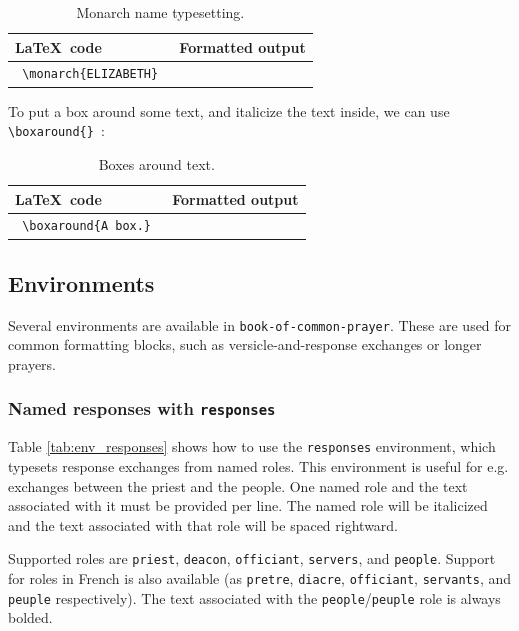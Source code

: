 \documentclass{article}
\begin{document}
\begin{table}[h!]
	\centering
	\begin{tabular}{l l} 
	\toprule
	\LaTeX\ code & Formatted output \\
	\midrule
	\lstinline! \monarch{ELIZABETH} ! & \sabon{\monarch{ELIZABETH}} \\
	\bottomrule
	\end{tabular}
	\caption{Monarch name typesetting.}
\end{table}

To put a box around some text, and italicize the text inside, we can use \lstinline! \boxaround{} !:

\begin{table}[h!]
	\centering
	\begin{tabular}{l l} 
	\toprule
	\LaTeX\ code & Formatted output \\
	\midrule
	\lstinline! \boxaround{A box.} ! & \sabon{\fbox{A box.}} \\
	\bottomrule
	\end{tabular}
	\caption{Boxes around text.}
\end{table}

\continued
\clearpage
\subsection{Environments}

Several environments are available in \texttt{book-of-common-prayer}. These are used for common formatting blocks, such as versicle-and-response exchanges or longer prayers.

\subsubsection{Named responses with \lstinline{responses}}

Table \ref{tab:env_responses} shows how to use the \lstinline{responses} environment, which typesets response exchanges from named roles. This environment is useful for e.g. exchanges between the priest and the people. One named role and the text associated with it must be provided per line. The named role will be italicized and the text associated with that role will be spaced rightward.

Supported roles are \lstinline{priest}, \lstinline{deacon}, \lstinline{officiant}, \lstinline{servers}, and \lstinline{people}. Support for roles in French is also available (as \lstinline{pretre}, \lstinline{diacre}, \lstinline{officiant}, \lstinline{servants}, and \lstinline{peuple} respectively). The text associated with the \lstinline{people}/\lstinline{peuple} role is always bolded.
\end{document}
